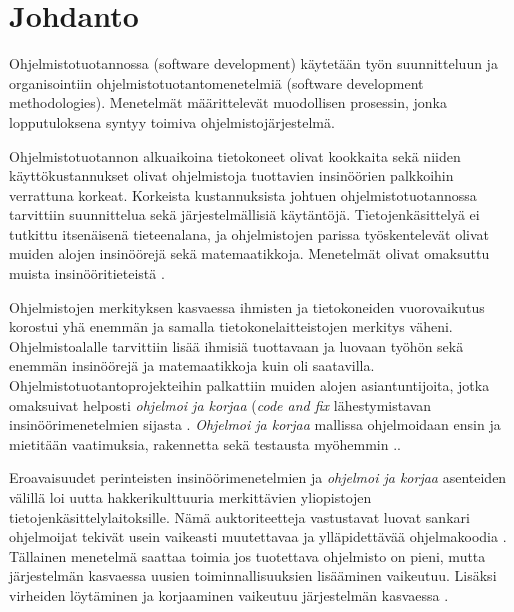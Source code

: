 \documentclass[finnish]{tktltiki2}
\title{}
\author{Jarl-Erik Malmström}
\date{\today}
\theoremstyle{definition}
\theoremstyle{remark}
\begin{document}

\maketitle        %
\makeabstract     %

\tableofcontents  %
\newpage          %



\section{Johdanto}
 
Ohjelmistotuotannossa (software development) käytetään työn suunnitteluun ja organisointiin ohjelmistotuotantomenetelmiä (software development methodologies). Menetelmät määrittelevät muodollisen prosessin, jonka lopputuloksena syntyy toimiva ohjelmistojärjestelmä.

Ohjelmistotuotannon alkuaikoina tietokoneet olivat kookkaita sekä niiden käyttö\-kustannukset olivat ohjelmistoja tuottavien insinöörien palkkoihin verrattuna korkeat. Korkeista kustannuksista johtuen ohjelmistotuotannossa tarvittiin suunnittelua sekä järjestelmällisiä käytäntöjä. Tietojenkäsittelyä ei tutkittu itsenäisenä tieteenalana, ja ohjelmistojen parissa työsken\-televät olivat muiden alojen insinöörejä sekä matemaatikkoja. Menetelmät olivat omaksuttu muista insinööritieteistä \cite{BOE06}.

Ohjelmistojen merkityksen kasvaessa ihmisten ja tietokoneiden vuorovaikutus korostui yhä enemmän ja samalla tietokonelaitteistojen merkitys väheni. Ohjelmistoalalle tarvittiin lisää ihmisiä tuottavaan ja luovaan työhön sekä enemmän insinöörejä ja matemaatikkoja kuin oli saatavilla. Ohjelmistotuotantoprojekteihin palkattiin muiden alojen asiantuntijoita, jotka omaksuivat helposti \textit{ohjelmoi ja korjaa} (\textit{code and fix} lähestymistavan insinööri\-menetelmien sijasta \cite{BOE06}. \textit{Ohjelmoi ja korjaa} mallissa ohjelmoidaan ensin ja mietitään vaatimuksia, rakennetta sekä testausta myöhemmin .\cite{BOE88}.

Eroavaisuudet perinteisten insinöörimenetelmien ja \textit{ohjelmoi ja korjaa} asenteiden välillä loi uutta hakkerikulttuuria merkittävien yliopistojen tietojenkäsittelylaitoksille. Nämä auktoriteetteja vastustavat luovat sankari ohjelmoijat tekivät usein vaikeasti muutettavaa ja ylläpidettävää ohjelmakoodia \cite{BOE06}. Tällainen menetelmä saattaa toimia jos tuotettava ohjelmisto on pieni, mutta järjestelmän kasvaessa uusien toiminnallisuuksien lisääminen vaikeutuu. Lisäksi virheiden löytäminen ja korjaaminen vaikeutuu järjestelmän kasvaessa \cite{FOW01a}.
\end{document}
